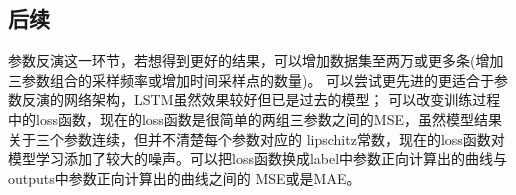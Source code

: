 \documentclass{article}
\begin{document}
\subsection*{后续}

参数反演这一环节，若想得到更好的结果，可以增加数据集至两万或更多条(增加三参数组合的采样频率或增加时间采样点的数量)。
可以尝试更先进的更适合于参数反演的网络架构，LSTM虽然效果较好但已是过去的模型；
可以改变训练过程中的loss函数，现在的loss函数是很简单的两组三参数之间的MSE，虽然模型结果关于三个参数连续，但并不清楚每个参数对应的
lipschitz常数，现在的loss函数对模型学习添加了较大的噪声。可以把loss函数换成label中参数正向计算出的曲线与outputs中参数正向计算出的曲线之间的
MSE或是MAE。
\end{document}
